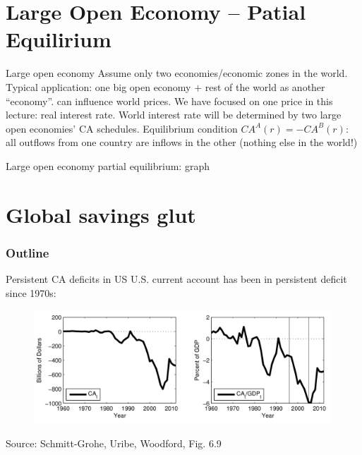 \documentclass{beamer}
\newcommand{\tb}[1]{{\color{blue}{\textbf{#1}}}}
\begin{document}
\section{Large Open Economy -- Patial Equilirium}

\begin{frame}{Large open economy}
  Assume only two economies/economic zones in the world. Typical application: one big open economy $+$ rest of the world as another ``economy''.
\vfill
  \tb{Large open economy} can influence world prices. We have focused on one price in this lecture: real interest rate.  
  \vfill 
  World interest rate will be determined by two large open economies' CA schedules.
  \vfill
  Equilibrium condition $CA^A(r) = -CA^B(r)$: all outflows from one country are inflows in the other (nothing else in the world!)
\end{frame}

\begin{frame}{Large open economy partial equilibrium: graph}
  
\end{frame}

\section{Global savings glut}
\begin{frame}
\frametitle{Outline}
\tableofcontents[currentsection]
\end{frame}

\begin{frame}{Persistent CA deficits in US}
  U.S. current account has been in persistent deficit since 1970s:
  \begin{figure}
	\centering
	\includegraphics[width = 0.99\textwidth]{FIGURES/CA_US.png}
  \end{figure}
  \vspace{-0.5cm}
  \begin{minipage}{\columnwidth}
  \footnotesize
  Source: Schmitt-Grohe, Uribe, Woodford, Fig. 6.9
  \end{minipage}
\end{frame}
\end{document}
